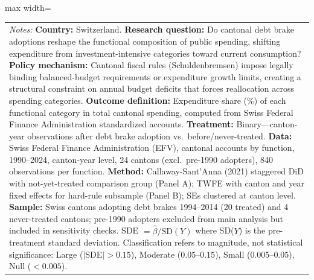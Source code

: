\begin{table}[htbp]
\begin{adjustbox}{max width=\textwidth}
\begin{tabular}{lcccccc}
\multicolumn{7}{p{0.95\textwidth}}{\footnotesize \textit{Notes:} \textbf{Country:} Switzerland. \textbf{Research question:} Do cantonal debt brake adoptions reshape the functional composition of public spending, shifting expenditure from investment-intensive categories toward current consumption? \textbf{Policy mechanism:} Cantonal fiscal rules (Schuldenbremsen) impose legally binding balanced-budget requirements or expenditure growth limits, creating a structural constraint on annual budget deficits that forces reallocation across spending categories. \textbf{Outcome definition:} Expenditure share (\%) of each functional category in total cantonal spending, computed from Swiss Federal Finance Administration standardized accounts. \textbf{Treatment:} Binary---canton-year observations after debt brake adoption vs.\ before/never-treated. \textbf{Data:} Swiss Federal Finance Administration (EFV), cantonal accounts by function, 1990--2024, canton-year level, 24 cantons (excl.\ pre-1990 adopters), 840 observations per function. \textbf{Method:} Callaway-Sant'Anna (2021) staggered DiD with not-yet-treated comparison group (Panel A); TWFE with canton and year fixed effects for hard-rule subsample (Panel B); SEs clustered at canton level. \textbf{Sample:} Swiss cantons adopting debt brakes 1994--2014 (20 treated) and 4 never-treated cantons; pre-1990 adopters excluded from main analysis but included in sensitivity checks. SDE $= \hat{\beta} / \text{SD}(Y)$ where SD($Y$) is the pre-treatment standard deviation. Classification refers to magnitude, not statistical significance: Large ($|$SDE$| > 0.15$), Moderate ($0.05$--$0.15$), Small ($0.005$--$0.05$), Null ($< 0.005$).} \\
\end{tabular}
\end{adjustbox}
\end{table}
